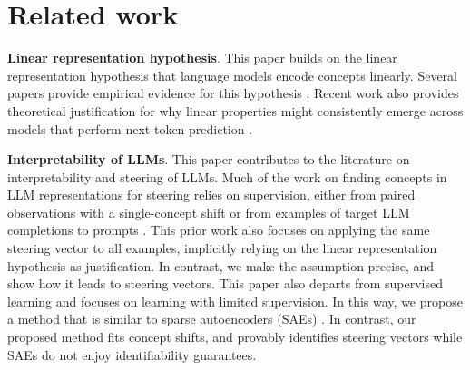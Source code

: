 \section{Related work}
\label{sec:rel}
\textbf{Linear representation hypothesis}. This paper builds on the linear representation hypothesis that language models encode concepts linearly. Several papers provide empirical evidence for this hypothesis \citep{mikolov-etal-2013-linguistic, gittens-etal-2017-skip, ethayarajh2019understandinglinearwordanalogies, allen2019analogiesexplainedunderstandingword, seonwoo-etal-2019-additive, burns2024discoveringlatentknowledgelanguage, li2024inferencetimeinterventionelicitingtruthful, moschella2023relativerepresentationsenablezeroshot, tigges2023linearrepresentationssentimentlarge, nanda2023emergentlinearrepresentationsworld, nissim-etal-2020-fair, ravfogel-etal-2020-null,park2023linear}. Recent work also provides theoretical justification for why linear properties might consistently emerge across models that perform next-token prediction \citep{roeder2021linear, jiang2024originslinearrepresentationslarge, marconato2024all,park2024geometrycategoricalhierarchicalconcepts}.  

\textbf{Interpretability of LLMs}. This paper contributes to the literature on interpretability and steering of LLMs. Much of the work on finding concepts in LLM representations for steering relies on supervision, either from paired observations with a single-concept shift \citep{panickssery2024steeringllama2contrastive,turner2024steeringlanguagemodelsactivation,rimsky2024steering,li2024inferencetimeinterventionelicitingtruthful} or from examples of target LLM completions to prompts \citep{subramani2022extracting}. This prior work also focuses on applying the same steering vector to all examples, implicitly relying on the linear representation hypothesis as justification. In contrast, we make the assumption precise, and show how it leads to steering vectors. This paper also departs from supervised learning and focuses on learning with limited supervision. In this way, we propose a method that is similar to sparse autoencoders (SAEs) \citep{templeton2024scaling, engels2024languagemodelfeatureslinear, cunningham2023sparseautoencodershighlyinterpretable, rajamanoharan2024improvingdictionarylearninggated, gao2024scaling}. In contrast, our proposed method fits concept shifts, and provably identifies steering vectors while SAEs do not enjoy identifiability guarantees.

